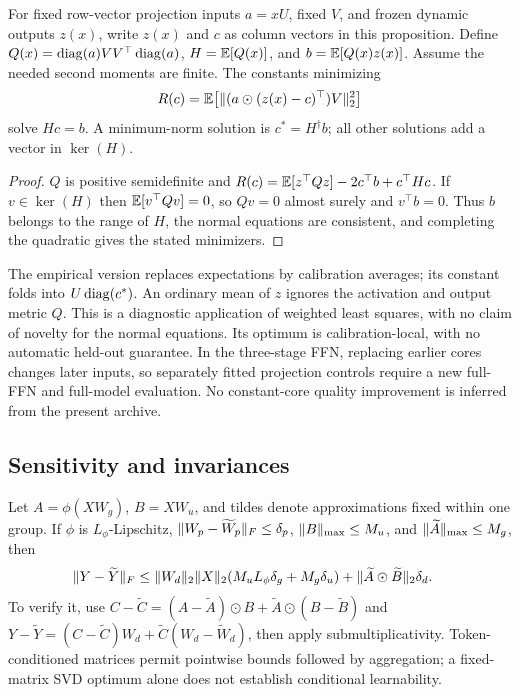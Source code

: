 \begin{proposition}\label{prop:constant}
For fixed row-vector projection inputs $a=xU$, fixed $V$, and frozen dynamic
outputs $z(x)$, write $z(x)$ and $c$ as column vectors in this proposition.
Define $Q(x)=\operatorname{diag}(a)VV^\top\operatorname{diag}(a)$,
$H=\mathbb{E}[Q(x)]$, and $b=\mathbb{E}[Q(x)z(x)]$. Assume the needed second moments are finite.
The constants minimizing
\begin{equation}
 R(c)=\mathbb{E}\bigl[\lVert (a\odot(z(x)-c)^\top)V\rVert_2^2\bigr]\label{eq:constant-risk}
\end{equation}
solve $Hc=b$. A minimum-norm solution is $c^*=H^\dagger b$; all other
solutions add a vector in $\ker(H)$.
\end{proposition}
\begin{proof}
$Q$ is positive semidefinite and
$R(c)=\mathbb{E}[z^\top Qz]-2c^\top b+c^\top Hc$.
If $v\in\ker(H)$ then $\mathbb{E}[v^\top Qv]=0$, so $Qv=0$ almost surely and
$v^\top b=0$. Thus $b$ belongs to the range of $H$, the normal equations
are consistent, and completing the quadratic gives the stated minimizers.
\end{proof}

The empirical version replaces expectations by calibration averages; its
constant folds into $U\operatorname{diag}(c^*)$. An ordinary mean of $z$ ignores the
activation and output metric $Q$. This is a diagnostic application of weighted
least squares, with no claim of novelty for the normal equations. Its optimum
is calibration-local, with no automatic held-out guarantee. In the three-stage
FFN, replacing earlier cores changes later inputs, so separately fitted
projection controls require a new full-FFN and full-model evaluation. No
constant-core quality improvement is inferred from the present archive.

\subsection{Sensitivity and invariances}
Let $A=\phi(XW_g)$, $B=XW_u$, and tildes denote approximations fixed within
one group. If $\phi$ is $L_\phi$-Lipschitz,
$\lVert W_p-\widetilde W_p\rVert_F\le\delta_p$,
$\lVert B\rVert_{\max}\le M_u$, and $\lVert \widetilde A\rVert_{\max}\le M_g$, then
\begin{align}
 \lVert Y-\widetilde Y\rVert_F
 &\le \lVert W_d\rVert_2\lVert X\rVert_2(M_uL_\phi\delta_g+M_g\delta_u)
   +\lVert \widetilde A\odot\widetilde B\rVert_2\delta_d.\label{eq:sensitivity}
\end{align}
To verify it, use $C-\widetilde C=(A-\widetilde A)\odot B+
\widetilde A\odot(B-\widetilde B)$ and
$Y-\widetilde Y=(C-\widetilde C)W_d+
\widetilde C(W_d-\widetilde W_d)$, then apply submultiplicativity.
Token-conditioned matrices permit pointwise bounds followed by aggregation;
a fixed-matrix SVD optimum alone does not establish conditional learnability.

